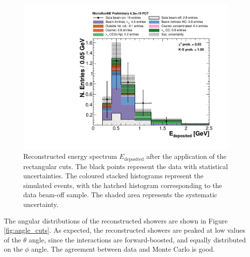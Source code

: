\begin{figure}[htbp]
\centering
  \includegraphics[width=0.75\linewidth]{figures/h_reco_energy_cuts.pdf}
  \caption{Reconstructed energy spectrum $E_{\mathrm{deposited}}$ after the application of the rectangular cuts. The black points represent the data with statistical uncertainties. The coloured stacked histograms represent the simulated events, with the hatched histogram corresponding to the data beam-off sample. The shaded area represents the systematic uncertainty.}\label{fig:reco_cuts}
\end{figure}

The angular distributions of the reconstructed showers are shown in Figure \ref{fig:angle_cuts}. As expected, the reconstructed showers are peaked at low values of the $\theta$ angle, since the interactions are forward-boosted, and equally distributed on the $\phi$ angle. The agreement between data and Monte Carlo is good.

